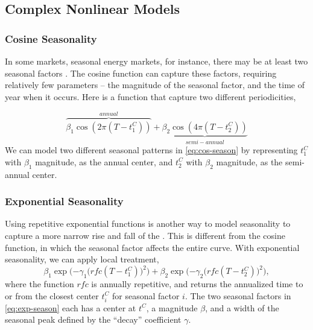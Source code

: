 \subsection{Complex Nonlinear Models}

\subsubsection{Cosine Seasonality}
In some markets, seasonal energy markets, for instance, there may be at least two seasonal factors \cite{pilipovic2007er}. The cosine function can capture these factors, requiring relatively few parameters -- the magnitude of the seasonal factor, and the time of year when it occurs. Here is a function that capture two different periodicities,

\begin{equation}
\overbrace{\beta_1 \cos(2 \pi (T-t^C_1))}^{annual} + \underbrace{\beta_2 \cos(4 \pi(T-t^C_2))}_{semi-annual}
\label{eq:cos-season}
\end{equation}
We can model two different seasonal patterns in \eqref{eq:cos-season} by representing $t^C_1$ with $\beta_1$ magnitude, as the annual center, and $t^C_2$ with $\beta_2$ magnitude, as the semi-annual center.

\subsubsection{Exponential Seasonality}
Using repetitive exponential functions is another way to model seasonality to capture a more narrow rise and fall of the \fts{}. This is different from the cosine function, in which the seasonal factor affects the entire curve. With exponential seasonality, we can apply local treatment,
\begin{equation}
\beta_1 \exp\Big({-\gamma_1 \big(rfc(T-t^C_1)\big)^2} \Big)+ \beta_2 \exp\Big({-\gamma_2 \big(rfc(T-t^C_2)\big)^2} \Big),
\label{eq:exp-season}
\end{equation}
where the function $rfc$ is annually repetitive, and returns the annualized time to or from the closest center $t^C_i$ for seasonal factor $i$. The two seasonal factors in \eqref{eq:exp-season} each has a center at $t^C$, a magnitude $\beta$, and a width of the seasonal peak defined by the ``decay'' coefficient $\gamma$.





